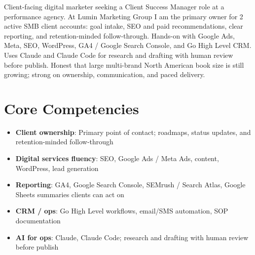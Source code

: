 \documentclass[11pt,a4paper,sans]{moderncv}
\begin{document}
\makecvtitle

\vspace{6pt}
\small{Client-facing digital marketer seeking a Client Success Manager role at a performance agency. At Lumin Marketing Group I am the primary owner for 2 active SMB client accounts: goal intake, SEO and paid recommendations, clear reporting, and retention-minded follow-through. Hands-on with Google Ads, Meta, SEO, WordPress, GA4 / Google Search Console, and Go High Level CRM. Uses Claude and Claude Code for research and drafting with human review before publish. Honest that large multi-brand North American book size is still growing; strong on ownership, communication, and paced delivery.}

\section{Core Competencies}
\vspace{1pt}
\begin{itemize}
\item \textbf{Client ownership}: Primary point of contact; roadmaps, status updates, and retention-minded follow-through
\item \textbf{Digital services fluency}: SEO, Google Ads / Meta Ads, content, WordPress, lead generation
\item \textbf{Reporting}: GA4, Google Search Console, SEMrush / Search Atlas, Google Sheets summaries clients can act on
\item \textbf{CRM / ops}: Go High Level workflows, email/SMS automation, SOP documentation
\item \textbf{AI for ops}: Claude, Claude Code; research and drafting with human review before publish
\end{itemize}
\end{document}
